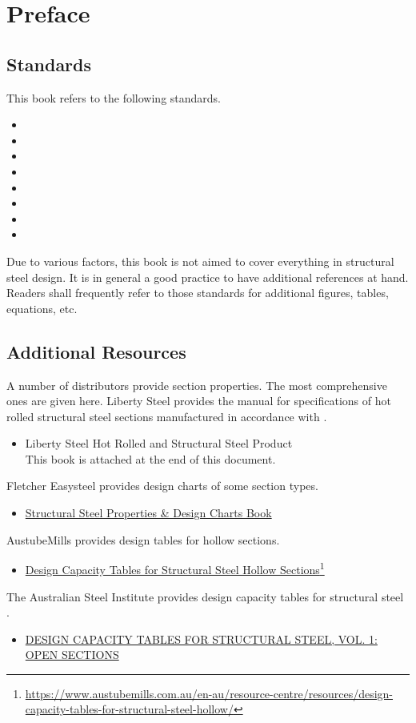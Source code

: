 \chapter{Preface}
\section{Standards}
This book refers to the following standards.
\begin{itemize}
\item \ASNZSACTION{}
\item \NZSSTEEL{}
\item \ASNZSSTEEL{}
\item \ASNZSPLATE{}
\item \ASNZSCOLD{}
\item \ASNZSWELD{}
\item \ASNZSFASTERNER{}
\item \ANSI{}
\end{itemize}
Due to various factors, this book is not aimed to cover everything in structural steel design. It is in general a good practice to have additional references at hand. Readers shall frequently refer to those standards for additional figures, tables, equations, etc.
\section{Additional Resources}
A number of distributors provide section properties. The most comprehensive ones are given here. Liberty Steel provides the manual for specifications of hot rolled structural steel sections manufactured in accordance with \ASNZSSTEEL{}.
\begin{itemize}
\item Liberty Steel Hot Rolled and Structural Steel Product\\This book is attached at the end of this document.
\end{itemize}
Fletcher Easysteel provides design charts of some section types.
\begin{itemize}
\item \href{run:./REF/STRUCTURAL.STEEL.PROPERTIES.DESIGN.CHARTS.BOOK.pdf}{Structural Steel Properties \& Design Charts Book}
\end{itemize}
AustubeMills provides design tables for hollow sections.
\begin{itemize}
\item \href{https://www.austubemills.com.au/en-au/resource-centre/resources/design-capacity-tables-for-structural-steel-hollow/}{Design Capacity Tables for Structural Steel Hollow Sections}\footnote{\url{https://www.austubemills.com.au/en-au/resource-centre/resources/design-capacity-tables-for-structural-steel-hollow/}}
\end{itemize}
The Australian Steel Institute provides design capacity tables for structural steel \citep{ASI2016}.
\begin{itemize}
\item \href{https://www.steel.org.au/resources/bookshop/products/design-capacity-tables-for-structural-steel,-vol/}{DESIGN CAPACITY TABLES FOR STRUCTURAL STEEL, VOL. 1: OPEN SECTIONS}
\end{itemize}

